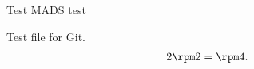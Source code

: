 \documentclass[11pt,a4paper,twoside,openany,final]{memoir}
\theoremstyle{break}
\theoremstyle{Break}
\begin{document}
Test MADS test 

Test file for Git. 
\begin{align*}
2 \rpm 2 = \rpm 4. 
\end{align*}
\end{document}
